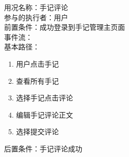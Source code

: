 \begin{framed}
\noindent
用况名称：手记评论\\
参与的执行者：用户\\
前置条件：成功登录到手记管理主页面\\
事件流：\\
基本路径：
\begin{enumerate}[itemsep=2pt,topsep=0pt,parsep=0pt,itemindent=1em]
    \item 用户点击手记
    \item 查看所有手记
    \item 选择手记点击评论
    \item 编辑手记评论正文
    \item 选择提交评论
    \end{enumerate}
\noindent
后置条件：手记评论成功
\end{framed}

